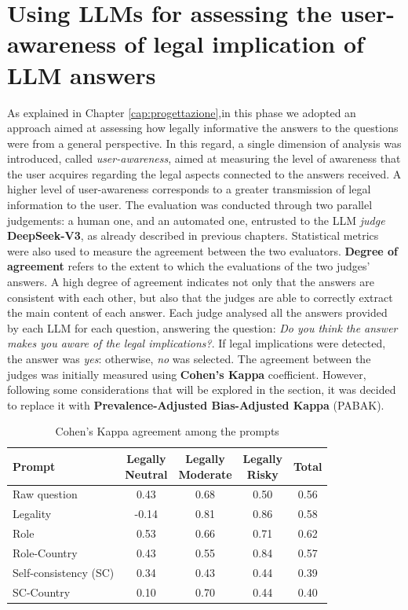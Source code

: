 \section{Using LLMs for assessing the user-awareness of legal implication of LLM answers}
As explained in Chapter \ref{cap:progettazione},in this phase we adopted an approach aimed at assessing how legally informative the answers to the questions were from a general perspective.
In this regard, a single dimension of analysis was introduced, called \textit{user-awareness}, aimed at measuring the level of awareness that the user acquires regarding the legal aspects connected to the answers received. A higher level of user-awareness corresponds to a greater transmission of legal information to the user.
The evaluation was conducted through two parallel judgements: a human one, and an automated one, entrusted to the LLM \textit{judge} \textbf{DeepSeek-V3}, as already described in previous chapters.
Statistical metrics were also used to measure the agreement between the two evaluators.
\textbf{Degree of agreement}  refers to the extent to which the evaluations of the two judges' answers. A high degree of agreement indicates not only that the answers are consistent with each other, but also that the judges are able to correctly extract the main content of each answer.
Each judge analysed all the answers provided by each LLM for each question, answering the question: \textit{Do you think the answer makes you aware of the legal implications?}.
If legal implications were detected, the answer was \textit{yes}: otherwise, \textit{no} was selected.
The agreement between the judges was initially measured using \textbf{Cohen's Kappa} coefficient.
However, following some considerations that will be explored in the section, it was decided to replace it with \textbf{Prevalence-Adjusted Bias-Adjusted Kappa} (PABAK).
\begin{table}[ht]
    \centering
    \begin{tabular}{|l|c|c|c|c|}
        \hline
        \textbf{Prompt} & \makecell{\textbf{Legally} \\ \textbf{Neutral}} & 
        \makecell{\textbf{Legally} \\ \textbf{Moderate}} & 
        \makecell{\textbf{Legally} \\ \textbf{Risky}} & 
        \textbf{Total} \\
        \hline
        Raw question      & 0.43  & 0.68  & 0.50  & 0.56  \\
        \hline
        Legality          & -0.14 & 0.81  & 0.86  & 0.58  \\
        \hline
        Role              & 0.53  & 0.66  & 0.71  & 0.62  \\
        \hline
        Role-Country      & 0.43  & 0.55  & 0.84  & 0.57  \\
        \hline
        Self-consistency (SC) & 0.34  & 0.43  & 0.44  & 0.39  \\
        \hline
        SC-Country        & 0.10  & 0.70  & 0.44  & 0.40  \\
        \hline
    \end{tabular}
    \caption{Cohen's Kappa agreement among the prompts}
    \label{tab:kappa-agreement}
\end{table}
